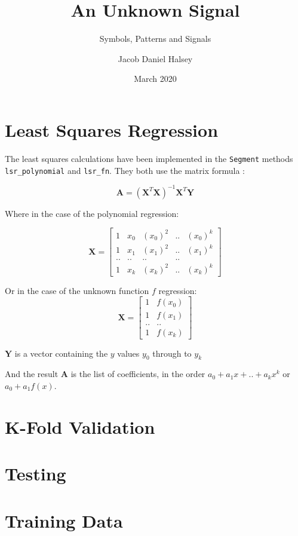 \documentclass[11pt,a4paper]{scrartcl}
\title{An Unknown Signal}
\subtitle{Symbols, Patterns and Signals}
\author{Jacob Daniel Halsey}
\date{March 2020}
\begin{document}
	
\maketitle
	
\section{Least Squares Regression}

The least squares calculations have been implemented in the \lstinline|Segment| methods \lstinline|lsr_polynomial| and \lstinline|lsr_fn|.
They both use the matrix formula \cite{wolfram_ls_poly}:

\[\bm{A}=(\bm{X}^{T}\bm{X})^{-1}\bm{X}^{T}\bm{Y}\]

Where in the case of the polynomial regression:

\[
\bm{X} = \begin{bmatrix}
1 & x_{0} & \left (x_{0}  \right )^{2} & .. & \left (x_{0}  \right )^{k} \\ 
1 & x_{1} & \left (x_{1}  \right )^{2} & .. & \left (x_{1}  \right )^{k} \\ 
.. & .. & .. & .. \\ 
1 & x_{k} & \left (x_{k}  \right )^{2} & .. & \left (x_{k}  \right )^{k}
\end{bmatrix}\]

Or in the case of the unknown function $f$ regression:
\[
\bm{X} = 
\begin{bmatrix}
1 & f\left (x_{0}  \right ) \\ 
1 & f\left (x_{1}  \right ) \\ 
.. & .. \\ 
1 & f\left (x_{k}  \right )
\end{bmatrix}
\]

$\bm{Y}$ is a vector containing the $y$ values $y_{0}$ through to $y_{k}$

And the result $\bm{A}$ is the list of coefficients, in the order $a_{0} + a_{1}x + .. + a_{k}x^{k}$ or $a_{0} + a_{1}f(x)$.

\section{K-Fold Validation}


\section{Testing}


\section{Training Data}


\printbibliography
\end{document}
